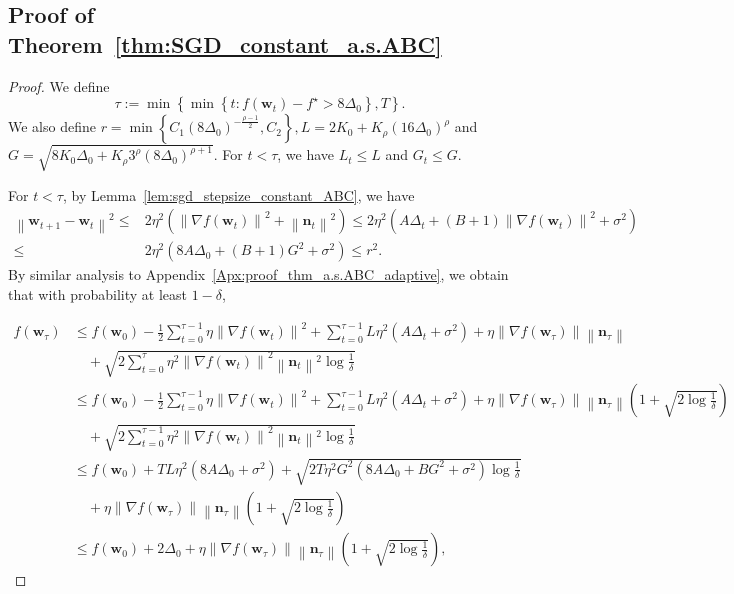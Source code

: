 \documentclass{article}
\newcommand{\Norm}[1]{\left\|#1\right\|}
\newcommand{\Kr}{K_{\rho}}
\newcommand{\paren}[1]{\left( #1 \right)}
\newcommand{\bw}{\mathbf{w}}
\newcommand{\bn}{\mathbf{n}}
\begin{document}
\subsection{Proof of Theorem~\ref{thm:SGD_constant_a.s.ABC}}

\begin{proof}
    We define $$\tau:=\min\left\{\min\left\{t:f(\bw_t)-f^\star>8\Delta_0\right\}, T\right\}.$$
     We also define $r=\min\left\{C_1\paren{8\Delta_0}^{-\frac{\rho-1}{2}},C_2\right\}, L=2K_0+\Kr\paren{16\Delta_0}^\rho$ and $G=\sqrt{8K_0\Delta_0+\Kr3^\rho\paren{8\Delta_0}^{\rho+1}}$.
    For $t<\tau$, we have $L_t\leq L$ and $G_t\leq G$.

    For $t<\tau$, by Lemma~\ref{lem:sgd_stepsize_constant_ABC}, we have
    \begin{align*}
    \Norm{\bw_{t+1}-\bw_t}^2\leq & 2\eta^2\paren{\Norm{\nabla f(\bw_t)}^2+\Norm{\bn_t}^2}\leq 2\eta^2\paren{A\Delta_t+(B+1)\Norm{\nabla f(\bw_t)}^2+\sigma^2}\\ \leq & 2\eta^2\paren{8A\Delta_0+(B+1)G^2+\sigma^2}\leq r^2.
    \end{align*}
    By similar analysis to Appendix~\ref{Apx:proof_thm_a.s.ABC_adaptive}, we obtain that with probability at least $1-\delta$, 
     
    \begin{equation}\label{eq:stoppingtime_sum_a.s.ABC_constant}
        \begin{aligned}
        f(\bw_\tau)&\leq f(\bw_0)-\frac{1}{2}\sum_{t=0}^{\tau-1}\eta\Norm{\nabla f(\bw_t)}^2+\sum_{t=0}^{\tau-1}L\eta^2\paren{A\Delta_t+\sigma^2}+\eta\Norm{\nabla f(\bw_\tau)}\Norm{\bn_\tau}\\
        &\quad+\sqrt{2\sum_{t=0}^{\tau}\eta^2\Norm{\nabla f(\bw_t)}^2\Norm{\bn_t}^2\log\frac{1}{\delta}}\\
        &\leq f(\bw_0)-\frac{1}{2}\sum_{t=0}^{\tau-1}\eta\Norm{\nabla f(\bw_t)}^2+\sum_{t=0}^{\tau-1}L\eta^2\paren{A\Delta_t+\sigma^2}+\eta\Norm{\nabla f(\bw_\tau)}\Norm{\bn_\tau}\paren{1+\sqrt{2\log\frac{1}{\delta}}}\\
        &\quad+\sqrt{2\sum_{t=0}^{\tau-1}\eta^2\Norm{\nabla f(\bw_t)}^2\Norm{\bn_t}^2\log\frac{1}{\delta}}\\
        &\leq f(\bw_0)+TL\eta^2\paren{8A\Delta_0+\sigma^2}+\sqrt{2T\eta^2G^2\paren{8A\Delta_0+BG^2+\sigma^2}\log\frac{1}{\delta}}\\
        &\quad + \eta\Norm{\nabla f(\bw_\tau)}\Norm{\bn_\tau}\paren{1+\sqrt{2\log\frac{1}{\delta}}}\\
        &\leq f(\bw_0)+2\Delta_0+\eta\Norm{\nabla f(\bw_\tau)}\Norm{\bn_\tau}\paren{1+\sqrt{2\log\frac{1}{\delta}}},
    \end{aligned}
    \end{equation}
    

\end{proof}
\end{document}
